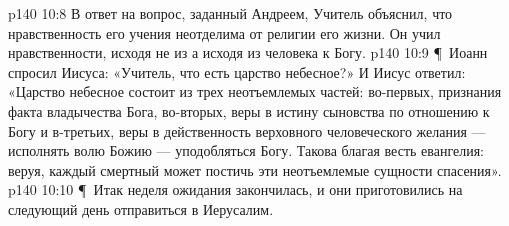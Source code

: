 \vs p140 10:8 В ответ на вопрос, заданный Андреем, Учитель объяснил, что нравственность его учения неотделима от религии его жизни. Он учил нравственности, исходя не из  а исходя из  человека к Богу.
\vs p140 10:9 \P\ Иоанн спросил Иисуса: «Учитель, что есть царство небесное?» И Иисус ответил: «Царство небесное состоит из трех неотъемлемых частей: во\hyp{}первых, признания факта владычества Бога, во\hyp{}вторых, веры в истину сыновства по отношению к Богу и в\hyp{}третьих, веры в действенность верховного человеческого желания --- исполнять волю Божию --- уподобляться Богу. Такова благая весть евангелия: веруя, каждый смертный может постичь эти неотъемлемые сущности спасения».
\vs p140 10:10 \P\ Итак неделя ожидания закончилась, и они приготовились на следующий день отправиться в Иерусалим.
